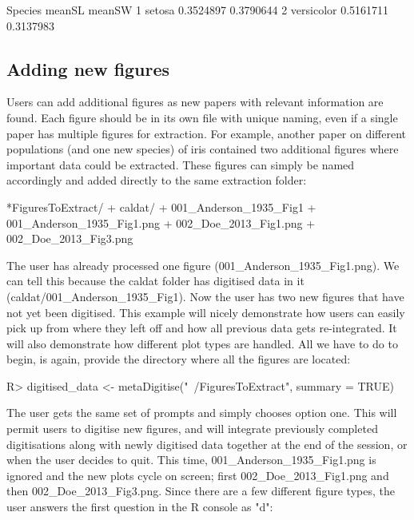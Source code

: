 \documentclass[12pt]{article}
\let\proglang=\textsf
\begin{document}
\begin{CodeChunk}
\begin{CodeOutput}
     Species    meanSL    meanSW
1     setosa 0.3524897 0.3790644
2 versicolor 0.5161711 0.3137983
\end{CodeOutput}
\end{CodeChunk}



\subsection{Adding new figures}

Users can add additional figures as new papers with relevant information are found. Each figure should be in its own file with unique naming, even if a single paper has multiple figures for extraction. For example, another paper on different populations (and one new species) of iris contained two additional figures where important data could be extracted. These figures can simply be named accordingly and added directly to the same extraction folder: 

\begin{CodeChunk}
\begin{CodeOutput}
*FiguresToExtract/
    + caldat/
        + 001_Anderson_1935_Fig1
    + 001_Anderson_1935_Fig1.png
    + 002_Doe_2013_Fig1.png
    + 002_Doe_2013_Fig3.png
\end{CodeOutput}
\end{CodeChunk}

The user has already processed one figure (001\_Anderson\_1935\_Fig1.png). We can tell this because the caldat folder has digitised data in it (caldat/001\_Anderson\_1935\_Fig1). Now the user has two new figures that have not yet been digitised. This example will nicely demonstrate how users can easily pick up from where they left off and how all previous data gets re-integrated. It will also demonstrate how different plot types are handled. All we have to do to begin, is again, provide the directory where all the figures are located:

\begin{CodeChunk}
\begin{CodeInput}
R> digitised_data <- metaDigitise("~/FiguresToExtract", summary = TRUE)
\end{CodeInput}
\end{CodeChunk}

The user gets the same set of prompts and simply chooses option one. This will permit users to digitise new figures, and will integrate previously completed digitisations along with newly digitised data together at the end of the session, or when the user decides to quit. This time, 001\_Anderson\_1935\_Fig1.png is ignored and the new plots cycle on screen; first 002\_Doe\_2013\_Fig1.png and then 002\_Doe\_2013\_Fig3.png. Since there are a few different figure types, the user answers the first question in the \proglang{R} console as "d":
\end{document}
